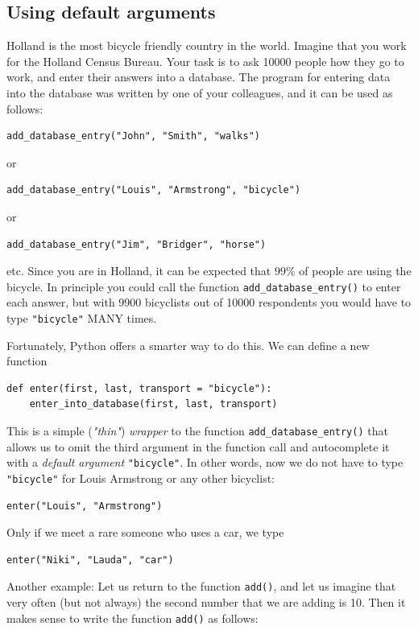 \subsection{Using default arguments}

Holland is the most bicycle friendly country in the world. Imagine that you 
work for the Holland Census Bureau. Your task is to ask 10000 
people how they go to work, and enter their answers into a database. 
The program for entering data into the database was written by one of 
your colleagues, and it can be used as follows:

\begin{verbatim}
add_database_entry("John", "Smith", "walks")
\end{verbatim}
or 
\begin{verbatim}
add_database_entry("Louis", "Armstrong", "bicycle")
\end{verbatim}
or
\begin{verbatim}
add_database_entry("Jim", "Bridger", "horse")
\end{verbatim}
etc. Since you are in Holland, it can be expected that $99 \%$ of people 
are using the bicycle. In principle you could call the function {\tt add\_database\_entry()} 
to enter each answer, but with 9900 bicyclists out of 10000 respondents you would have to 
type {\tt "bicycle"} MANY times. 

Fortunately, Python offers a smarter way to do this. We can define a new function 

\begin{verbatim}
def enter(first, last, transport = "bicycle"):
    enter_into_database(first, last, transport)
\end{verbatim}
This is a simple ({\em "thin"}) {\em wrapper} to the function {\tt add\_database\_entry()} 
that allows us to omit the third argument in the function call and autocomplete 
it with a {\em default argument} {\tt "bicycle"}. In other words, now we do not have to 
type {\tt "bicycle"} for Louis Armstrong or any other bicyclist:

\begin{verbatim}
enter("Louis", "Armstrong")
\end{verbatim}
Only if we meet a rare someone who uses a car, we type 

\begin{verbatim}
enter("Niki", "Lauda", "car")
\end{verbatim}
Another example: Let us return to the function {\tt add()}, and let us 
imagine that very often (but not always) the second number that we
are adding is 10. Then it makes sense to write the function {\tt add()}
as follows:

